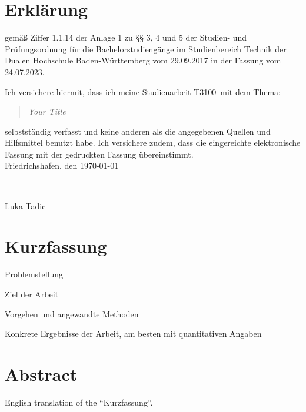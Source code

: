 \documentclass{scrbook} %
\newcommand{\titel}{Your Title}
\newcommand{\untertitel}{Your Subtitle}
\newcommand{\arbeit}{Studienarbeit T3100}
\newcommand{\autor}{Luka Tadic}
\begin{document}
\chapter*{Erklärung} %

gemäß Ziffer 1.1.14 der Anlage 1 zu §§ 3, 4 und 5  der Studien- und Prüfungsordnung für die Bachelorstudiengänge im Studienbereich Technik der Dualen Hochschule Baden-Württemberg vom 29.09.2017 in der Fassung vom 24.07.2023.

Ich versichere hiermit, dass ich meine \arbeit\ mit dem Thema:

\begin{quote}
	\textit{\titel} %
\end{quote}

selbstständig verfasst und keine anderen als die angegebenen Quellen und Hilfsmittel benutzt habe. Ich versichere zudem, dass die eingereichte elektronische Fassung mit der gedruckten Fassung übereinstimmt.\\[6ex]

Friedrichshafen, den \today \\[1ex]

\rule[-0.2cm]{5cm}{0.5pt} \\

\autor \\[10ex]

\rmfamily

\thispagestyle{empty}

\chapter*{Kurzfassung} %

Problemstellung

Ziel der Arbeit

Vorgehen und angewandte Methoden

Konkrete Ergebnisse der Arbeit, am besten mit quantitativen Angaben

\clearpage

\chapter*{Abstract} %

English translation of the ``Kurzfassung''.
\end{document}
